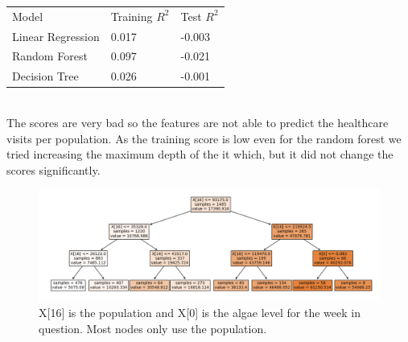 \documentclass[a4paper, 12pt, english]{article}
\begin{document}
\begin{tabular}{l l l}
Model & Training \(R^2\) & Test \(R^2\) \\
Linear Regression & 0.017 & -0.003 \\
Random Forest & 0.097 & -0.021 \\
Decision Tree & 0.026 & -0.001 \\
\end{tabular}
\\

The scores are very bad so the features are not able
to predict the healthcare visits per population.
As the training score is low even for
the random forest we tried increasing the maximum depth of
the it which, but it did not change the scores significantly.


\begin{figure}
\includegraphics[width=\textwidth]{tree1}
\caption{
X[16] is the population and X[0] is the algae level for the week in question.
Most nodes only use the population.
}
\label{tree1}
\end{figure}
\end{document}
